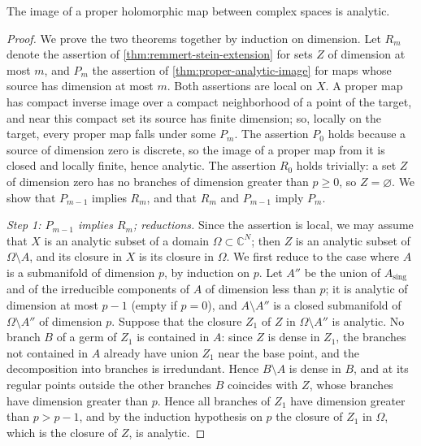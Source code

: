 \begin{theorem}[Remmert]\label{thm:proper-analytic-image}
The image of a proper holomorphic map between complex spaces is analytic.
\end{theorem}
\begin{proof}
We prove the two theorems together by induction on dimension. Let $R_m$ denote the assertion of \cref{thm:remmert-stein-extension} for sets $Z$ of dimension at most $m$, and $P_m$ the assertion of \cref{thm:proper-analytic-image} for maps whose source has dimension at most $m$. Both assertions are local on $X$. A proper map has compact inverse image over a compact neighborhood of a point of the target, and near this compact set its source has finite dimension; so, locally on the target, every proper map falls under some $P_m$. The assertion $P_0$ holds because a source of dimension zero is discrete, so the image of a proper map from it is closed and locally finite, hence analytic. The assertion $R_0$ holds trivially: a set $Z$ of dimension zero has no branches of dimension greater than $p\geq0$, so $Z=\varnothing$. We show that $P_{m-1}$ implies $R_m$, and that $R_m$ and $P_{m-1}$ imply $P_m$.

\emph{Step 1: $P_{m-1}$ implies $R_m$; reductions.} Since the assertion is local, we may assume that $X$ is an analytic subset of a domain $\Omega\subset\mathbb C^N$; then $Z$ is an analytic subset of $\Omega\setminus A$, and its closure in $X$ is its closure in $\Omega$. We first reduce to the case where $A$ is a submanifold of dimension $p$, by induction on $p$. Let $A''$ be the union of $A_{\mathrm{sing}}$ and of the irreducible components of $A$ of dimension less than $p$; it is analytic of dimension at most $p-1$ (empty if $p=0$), and $A\setminus A''$ is a closed submanifold of $\Omega\setminus A''$ of dimension $p$. Suppose that the closure $Z_1$ of $Z$ in $\Omega\setminus A''$ is analytic. No branch $B$ of a germ of $Z_1$ is contained in $A$: since $Z$ is dense in $Z_1$, the branches not contained in $A$ already have union $Z_1$ near the base point, and the decomposition into branches is irredundant. Hence $B\setminus A$ is dense in $B$, and at its regular points outside the other branches $B$ coincides with $Z$, whose branches have dimension greater than $p$. Hence all branches of $Z_1$ have dimension greater than $p>p-1$, and by the induction hypothesis on $p$ the closure of $Z_1$ in $\Omega$, which is the closure of $Z$, is analytic.


\end{proof}
